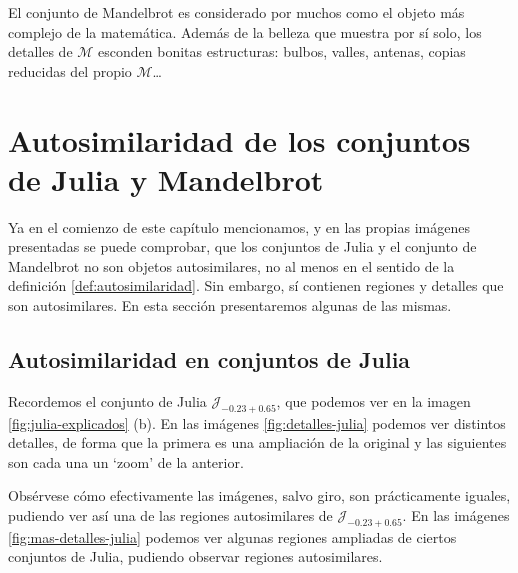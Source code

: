 El conjunto de Mandelbrot es considerado por muchos como el objeto más complejo de la matemática. Además de la belleza que muestra por sí solo, los detalles de $\mathcal{M}$ esconden bonitas estructuras: bulbos, valles, antenas, copias reducidas del propio $\mathcal{M}$\dots

\section{Autosimilaridad de los conjuntos de Julia y Mandelbrot}
\label{section:autosimilaridad-julia-mandelbrot}

Ya en el comienzo de este capítulo mencionamos, y en las propias imágenes presentadas se puede comprobar, que los conjuntos de Julia y el conjunto de Mandelbrot no son objetos autosimilares, no al menos en el sentido de la definición \ref{def:autosimilaridad}. Sin embargo, sí contienen regiones y detalles que son autosimilares. En esta sección presentaremos algunas de las mismas.

\subsection{Autosimilaridad en conjuntos de Julia}

Recordemos el conjunto de Julia $\mathcal{J}_{-0.23+0.65}$, que podemos ver en la imagen \ref{fig:julia-explicados} (b). En las imágenes \ref{fig:detalles-julia} podemos ver distintos detalles, de forma que la primera es una ampliación de la original y las siguientes son cada una un `zoom' de la anterior.

Obsérvese cómo efectivamente las imágenes, salvo giro, son prácticamente iguales, pudiendo ver así una de las regiones autosimilares de $\mathcal{J}_{-0.23+0.65}$. En las imágenes \ref{fig:mas-detalles-julia} podemos ver algunas regiones ampliadas de ciertos conjuntos de Julia, pudiendo observar regiones autosimilares.

\newpage

